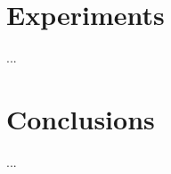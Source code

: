 \documentclass[conference]{IEEEtran}
\begin{document}

\section{Experiments}
...


\section{Conclusions}
...


\balance

 


\end{document}
